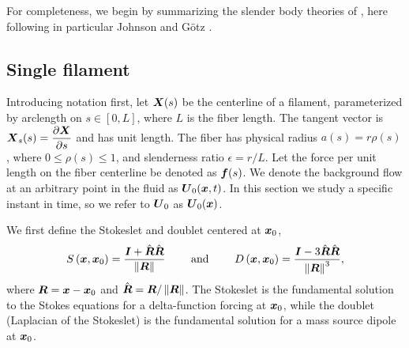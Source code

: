 For completeness, we begin by summarizing the slender body theories of \cite{krub, johnson, gotz2001interactions}, here following in particular Johnson \cite{johnson} and G\"otz \cite{gotz2001interactions}. 

\subsection{Single filament}
Introducing notation first, let $\boldsymbol{X}(s)$ be the centerline of a filament, parameterized by arclength on $s \in [0,L]$, where $L$ is the fiber length. The tangent vector is $\boldsymbol{X}_s(s)=\displaystyle{\frac{\partial \boldsymbol{X}}{\partial s}}$ and has unit length. The fiber has physical radius $a(s) = r \rho(s)$, where $0 \leq \rho(s) \leq 1$, and slenderness ratio $\epsilon = r/L$. Let the force per unit length on the fiber centerline be denoted as $\boldsymbol{f}(s)$. We denote the background flow at an arbitrary point in the fluid as $\boldsymbol{U}_0(\boldsymbol{x},t)$. In this section we study a specific instant in time, so we refer to $\boldsymbol{U}_0$ as $\boldsymbol{U}_0(\boldsymbol{x})$. 

We first define the Stokeslet and doublet centered at $\boldsymbol{x}_0$, 
\begin{equation}
\label{eq:Slet}
S\left(\boldsymbol{x},\boldsymbol{x}_0\right) = \frac{\boldsymbol{I}+\hat{\boldsymbol{R}}\hat{\boldsymbol{R}}}{\left\Vert \boldsymbol{R}\right\Vert} \qquad \text{ and } \qquad 
D\left(\boldsymbol{x},\boldsymbol{x}_0\right) = \frac{\boldsymbol{I}-3\hat{\boldsymbol{R}}\hat{\boldsymbol{R}}}{\left\Vert \boldsymbol{R}\right\Vert^3},
\end{equation}
where $\boldsymbol{R} = \boldsymbol{x}-\boldsymbol{x}_0$ and $\hat{\boldsymbol{R}}=\boldsymbol{R}/\left\Vert \boldsymbol{R}\right\Vert$. The Stokeslet is the fundamental solution to the Stokes equations for a delta-function forcing at $\boldsymbol{x}_0$, while the doublet (Laplacian of the Stokeslet) is the fundamental solution for a mass source dipole at $\boldsymbol{x}_0$. 

